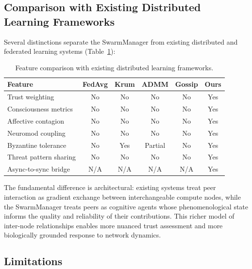 \documentclass[11pt,a4paper]{article}
\begin{document}
\subsection{Comparison with Existing Distributed Learning Frameworks}

Several distinctions separate the SwarmManager from existing distributed and federated learning systems (Table~\ref{tab:comparison}):

\begin{table}[h]
\centering
\caption{Feature comparison with existing distributed learning frameworks.}
\label{tab:comparison}
\begin{tabular}{p{3.5cm}ccccc}
\toprule
\textbf{Feature} & \textbf{FedAvg} & \textbf{Krum} & \textbf{ADMM} & \textbf{Gossip} & \textbf{Ours} \\
\midrule
Trust weighting & No & No & No & No & Yes \\
Consciousness metrics & No & No & No & No & Yes \\
Affective contagion & No & No & No & No & Yes \\
Neuromod coupling & No & No & No & No & Yes \\
Byzantine tolerance & No & Yes & Partial & No & Yes \\
Threat pattern sharing & No & No & No & No & Yes \\
Async-to-sync bridge & N/A & N/A & N/A & N/A & Yes \\
\bottomrule
\end{tabular}
\end{table}

The fundamental difference is architectural: existing systems treat peer interaction as gradient exchange between interchangeable compute nodes, while the SwarmManager treats peers as cognitive agents whose phenomenological state informs the quality and reliability of their contributions. This richer model of inter-node relationships enables more nuanced trust assessment and more biologically grounded response to network dynamics.

\subsection{Limitations}
\end{document}
